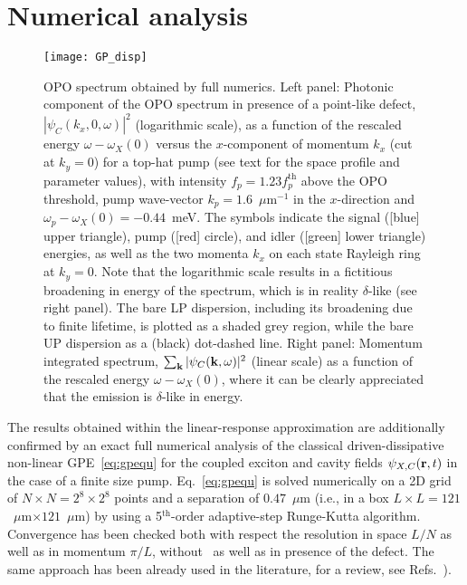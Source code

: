 \section{Numerical analysis}
\label{sec:numerical-analysis}
%
\begin{figure}[tb]\centering
\texttt{[image: GP\_disp]}
\caption{OPO spectrum obtained by full numerics. Left
  panel: Photonic component of the OPO spectrum in presence of a
  point-like defect, $|\psi_C(k_x,0,\omega)|^2$ (logarithmic scale),
  as a function of the rescaled energy $\omega - \omega_X(0)$ versus
  the $x$-component of momentum $k_x$ (cut at $k_y=0$) for a top-hat
  pump (see text for the space profile and parameter values), with
  intensity $f_p=1.23 f_p^{\text{th}}$ above the OPO threshold, pump
  wave-vector $k_p=1.6$~$\mu$m$^{-1}$ in the $x$-direction and
  $\omega_p-\omega_X(0)=-0.44$~meV. The symbols indicate the signal
  ([blue] upper triangle), pump ([red] circle), and idler ([green]
  lower triangle) energies, as well as the two momenta $k_x$ on each
  state Rayleigh ring at $k_y=0$. Note that the logarithmic scale
  results in a fictitious broadening in energy of the spectrum, which
  is in reality $\delta$-like (see right panel). The bare LP
  dispersion, including its broadening due to finite lifetime, is
  plotted as a shaded grey region, while the bare UP dispersion as a
  (black) dot-dashed line. Right panel: Momentum integrated spectrum,
  $\sum_{\mathbf{k}} |\psi_C(\mathbf{k},\omega)|^2$ (linear scale) as a
  function of the rescaled energy $\omega - \omega_X(0)$, where it can
  be clearly appreciated that the emission is $\delta$-like in
  energy.}
\label{fig:spectGP}
\end{figure}
%
The results obtained within the linear-response approximation are
additionally confirmed by an exact full numerical analysis of the
classical driven-dissipative non-linear GPE~\eqref{eq:gpequ} for the
coupled exciton and cavity fields $\psi_{X,C} (\mathbf{r},t)$ in the case
of a finite size pump. Eq.~\eqref{eq:gpequ} is solved numerically on a
2D grid of $N\times N=2^8\times 2^8$ points and a separation of
$0.47$~$\mu$m (i.e., in a box $L\times L =
121$~$\mu$m$\times 121$~$\mu$m) by using a 5$^{\text{th}}$-order
adaptive-step Runge-Kutta algorithm. Convergence has been checked both
with respect the resolution in space $L/N$ as well as in momentum
$\pi/L$, without~\cite{Marchetti_2010,9783642241857} as well as in
presence of the defect.
%
The same approach has been already used in the literature, for a
review, see Refs.~\cite{Marchetti_2010,9783642241857}).

